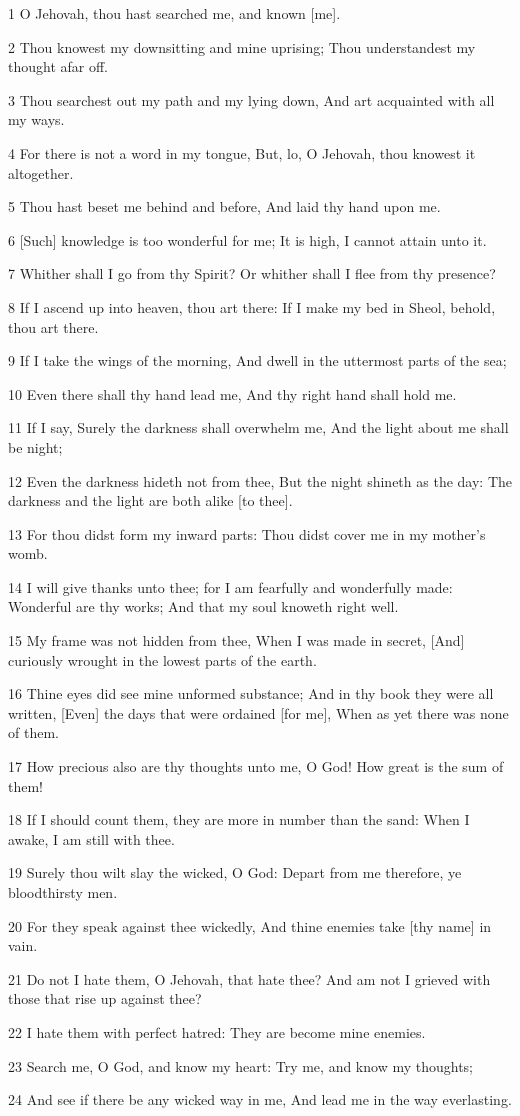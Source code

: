 \par 1 O Jehovah, thou hast searched me, and known [me].
\par 2 Thou knowest my downsitting and mine uprising; Thou understandest my thought afar off.
\par 3 Thou searchest out my path and my lying down, And art acquainted with all my ways.
\par 4 For there is not a word in my tongue, But, lo, O Jehovah, thou knowest it altogether.
\par 5 Thou hast beset me behind and before, And laid thy hand upon me.
\par 6 [Such] knowledge is too wonderful for me; It is high, I cannot attain unto it.
\par 7 Whither shall I go from thy Spirit? Or whither shall I flee from thy presence?
\par 8 If I ascend up into heaven, thou art there: If I make my bed in Sheol, behold, thou art there.
\par 9 If I take the wings of the morning, And dwell in the uttermost parts of the sea;
\par 10 Even there shall thy hand lead me, And thy right hand shall hold me.
\par 11 If I say, Surely the darkness shall overwhelm me, And the light about me shall be night;
\par 12 Even the darkness hideth not from thee, But the night shineth as the day: The darkness and the light are both alike [to thee].
\par 13 For thou didst form my inward parts: Thou didst cover me in my mother's womb.
\par 14 I will give thanks unto thee; for I am fearfully and wonderfully made: Wonderful are thy works; And that my soul knoweth right well.
\par 15 My frame was not hidden from thee, When I was made in secret, [And] curiously wrought in the lowest parts of the earth.
\par 16 Thine eyes did see mine unformed substance; And in thy book they were all written, [Even] the days that were ordained [for me], When as yet there was none of them.
\par 17 How precious also are thy thoughts unto me, O God! How great is the sum of them!
\par 18 If I should count them, they are more in number than the sand: When I awake, I am still with thee.
\par 19 Surely thou wilt slay the wicked, O God: Depart from me therefore, ye bloodthirsty men.
\par 20 For they speak against thee wickedly, And thine enemies take [thy name] in vain.
\par 21 Do not I hate them, O Jehovah, that hate thee? And am not I grieved with those that rise up against thee?
\par 22 I hate them with perfect hatred: They are become mine enemies.
\par 23 Search me, O God, and know my heart: Try me, and know my thoughts;
\par 24 And see if there be any wicked way in me, And lead me in the way everlasting.

